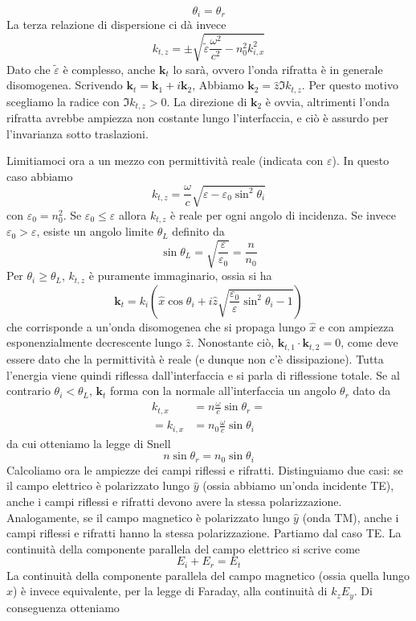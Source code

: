 \documentclass[a4paper,11pt]{book}
\renewcommand{\vec}[1]{\mathbf{#1}}
\theoremstyle{theorem}
\theoremstyle{definition}
\begin{document}
\[\theta_i=\theta_r\]
La terza relazione di dispersione ci dà invece
\[k_{t,z}=\pm\sqrt{\tilde{\varepsilon}\frac{\omega^2}{c^2}-n_0^2k_{i,x}^2}\]
Dato che $\tilde{\varepsilon}$ è complesso, anche $\vec{k}_t$ lo sarà, ovvero l'onda rifratta è in generale disomogenea. Scrivendo $\vec{k}_t=\vec{k}_1+i\vec{k}_2$, Abbiamo $\vec{k}_2=\hat{z}\Im k_{t,z}$. Per questo motivo scegliamo la radice con $\Im k_{t,z}>0$. La direzione di $\vec{k}_2$ è ovvia, altrimenti l'onda rifratta avrebbe ampiezza non costante lungo l'interfaccia, e ciò è assurdo per l'invarianza sotto traslazioni.

\noindent Limitiamoci ora a un mezzo con permittività reale (indicata con $\varepsilon$). In questo caso abbiamo
\[k_{t,z}=\frac{\omega}{c}\sqrt{\varepsilon-\varepsilon_0\sin^2\theta_i}\]
con $\varepsilon_0=n_0^2$. Se $\varepsilon_0\leq\varepsilon$ allora $k_{t,z}$ è reale per ogni angolo di incidenza. Se invece $\varepsilon_0>\varepsilon$, esiste un angolo limite $\theta_L$ definito da
\[\sin\theta_L=\sqrt{\frac{\varepsilon}{\varepsilon_0}}=\frac{n}{n_0}\]
Per $\theta_i\geq\theta_L$, $k_{t,z}$ è puramente immaginario, ossia si ha
\[\vec{k}_t=k_i\left(\hat{x}\cos\theta_i+i\hat{z}\sqrt{\frac{\varepsilon_0}{\varepsilon}\sin^2\theta_i-1}\right)\]
che corrisponde a un'onda disomogenea che si propaga lungo $\hat{x}$ e con ampiezza esponenzialmente decrescente lungo $\hat{z}$. Nonostante ciò, $\vec{k}_{t,1}\cdot\vec{k}_{t,2}=0$, come deve essere dato che la permittività è reale (e dunque non c'è dissipazione). Tutta l'energia viene quindi riflessa dall'interfaccia e si parla di riflessione totale. Se al contrario $\theta_i<\theta_L$, $\vec{k}_t$ forma con la normale all'interfaccia un angolo $\theta_r$ dato da
\begin{align*}
	k_{t,x}&=n\frac{\omega}{c}\sin\theta_r=\\=k_{i,x}&=n_0\frac{\omega}{c}\sin\theta_i
\end{align*}
da cui otteniamo la legge di Snell
\[n\sin\theta_r=n_0\sin\theta_i\]
Calcoliamo ora le ampiezze dei campi riflessi e rifratti. Distinguiamo due casi: se il campo elettrico è polarizzato lungo $\hat{y}$ (ossia abbiamo un'onda incidente TE), anche i campi riflessi e rifratti devono avere la stessa polarizzazione. Analogamente, se il campo magnetico è polarizzato lungo $\hat{y}$ (onda TM), anche i campi riflessi e rifratti hanno la stessa polarizzazione. Partiamo dal caso TE. La continuità della componente parallela del campo elettrico si scrive come
\[E_{i}+E_r=E_t\]
La continuità della componente parallela del campo magnetico (ossia quella lungo $\hat{x}$) è invece equivalente, per la legge di Faraday, alla continuità di $k_zE_y$. Di conseguenza otteniamo
\end{document}
